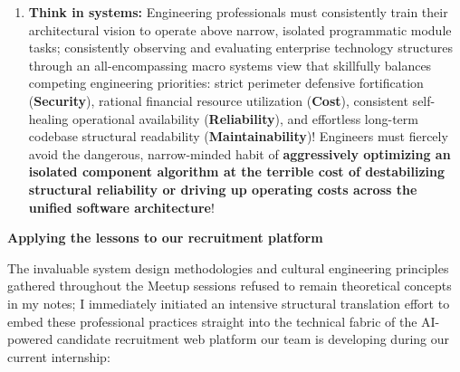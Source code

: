 \begin{enumerate}
  \begin{itemize}
  \tightlist
  \item
    Complex algorithmic outputs, empirical metric discoveries, and
    technical debugging discoveries \textbf{must be successfully
    synthesized and articulated as intuitive, structured
    natural-language narratives that non-technical business leaders can
    easily understand and act upon}!
  \item
    Diverse collaborative technical teams \textbf{must proactively
    establish clear, shared operational understandings of system
    architecture, deployment configurations, and runtime telemetry},
    actively dissolving unproductive communicative barriers dividing
    application programmers (Dev) from system administrators (Ops)!
  \item
    End-user customers and commercial product executives \textbf{deserve
    clean, easily comprehensible explanations and verifiable proof of
    outcomes} regarding the performance and decisions delivered by
    automated underlying technology systems!
  \end{itemize}
\item
  \textbf{Think in systems:} Engineering professionals must consistently
  train their architectural vision to operate above narrow, isolated
  programmatic module tasks; consistently observing and evaluating
  enterprise technology structures through an all-encompassing macro
  systems view that skillfully balances competing engineering
  priorities: strict perimeter defensive fortification
  (\textbf{Security}), rational financial resource utilization
  (\textbf{Cost}), consistent self-healing operational availability
  (\textbf{Reliability}), and effortless long-term codebase structural
  readability (\textbf{Maintainability})! Engineers must fiercely avoid
  the dangerous, narrow-minded habit of \textbf{aggressively optimizing
  an isolated component algorithm at the terrible cost of destabilizing
  structural reliability or driving up operating costs across the
  unified software architecture}!
\end{enumerate}

\vspace{0.5em}\noindent\textbf{Applying the lessons to our recruitment
platform}\par

The invaluable system design methodologies and cultural engineering
principles gathered throughout the Meetup sessions refused to remain
theoretical concepts in my notes; I immediately initiated an intensive
structural translation effort to embed these professional practices
straight into the technical fabric of the AI-powered candidate
recruitment web platform our team is developing during our current
internship:


